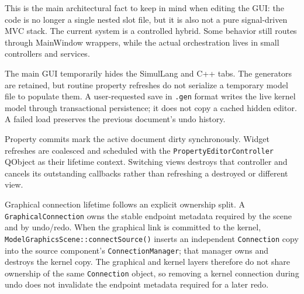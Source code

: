 This is the main architectural fact to keep in mind when editing the GUI: the code is no longer a single nested slot file, but it is also not a pure signal-driven MVC stack. The current system is a controlled hybrid. Some behavior still routes through MainWindow wrappers, while the actual orchestration lives in small controllers and services.

The main GUI temporarily hides the SimulLang and C++ tabs. The generators are
retained, but routine property refreshes do not serialize a temporary model
file to populate them. A user-requested save in \texttt{.gen} format writes the
live kernel model through transactional persistence; it does not copy a cached
hidden editor. A failed load preserves the previous document's undo history.

Property commits mark the active document dirty synchronously. Widget refreshes
are coalesced and scheduled with the \texttt{PropertyEditorController} QObject
as their lifetime context. Switching views destroys that controller and cancels
its outstanding callbacks rather than refreshing a destroyed or different view.

Graphical connection lifetime follows an explicit ownership split. A
\texttt{GraphicalConnection} owns the stable endpoint metadata required by the
scene and by undo/redo. When the graphical link is committed to the kernel,
\texttt{ModelGraphicsScene::connectSource()} inserts an independent
\texttt{Connection} copy into the source component's
\texttt{ConnectionManager}; that manager owns and destroys the kernel copy.
The graphical and kernel layers therefore do not share ownership of the same
\texttt{Connection} object, so removing a kernel connection during undo does
not invalidate the endpoint metadata required for a later redo.

